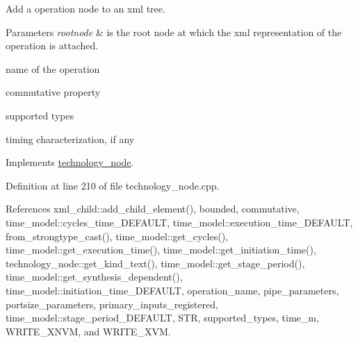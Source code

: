 Add a operation node to an xml tree. 


\begin{DoxyParams}{Parameters}
{\em rootnode} & is the root node at which the xml representation of the operation is attached. \\
\hline
\end{DoxyParams}
name of the operation

commutative property

supported types

timing characterization, if any 

Implements \hyperlink{structtechnology__node_a8ce6644a0b2700f760936e4c02754e2f}{technology\+\_\+node}.



Definition at line 210 of file technology\+\_\+node.\+cpp.



References xml\+\_\+child\+::add\+\_\+child\+\_\+element(), bounded, commutative, time\+\_\+model\+::cycles\+\_\+time\+\_\+\+D\+E\+F\+A\+U\+LT, time\+\_\+model\+::execution\+\_\+time\+\_\+\+D\+E\+F\+A\+U\+LT, from\+\_\+strongtype\+\_\+cast(), time\+\_\+model\+::get\+\_\+cycles(), time\+\_\+model\+::get\+\_\+execution\+\_\+time(), time\+\_\+model\+::get\+\_\+initiation\+\_\+time(), technology\+\_\+node\+::get\+\_\+kind\+\_\+text(), time\+\_\+model\+::get\+\_\+stage\+\_\+period(), time\+\_\+model\+::get\+\_\+synthesis\+\_\+dependent(), time\+\_\+model\+::initiation\+\_\+time\+\_\+\+D\+E\+F\+A\+U\+LT, operation\+\_\+name, pipe\+\_\+parameters, portsize\+\_\+parameters, primary\+\_\+inputs\+\_\+registered, time\+\_\+model\+::stage\+\_\+period\+\_\+\+D\+E\+F\+A\+U\+LT, S\+TR, supported\+\_\+types, time\+\_\+m, W\+R\+I\+T\+E\+\_\+\+X\+N\+VM, and W\+R\+I\+T\+E\+\_\+\+X\+VM.

